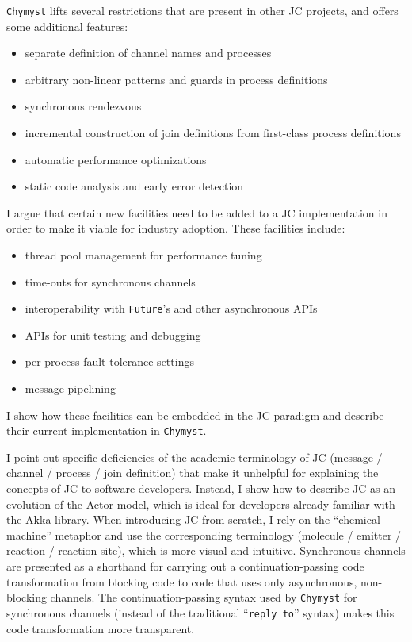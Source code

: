 \documentclass[sigplan,10pt,review,anonymous]{acmart}\settopmatter{printfolios=true}
\begin{document}
\texttt{Chymyst} lifts several restrictions that are present in other
JC projects, and offers some additional features:
\begin{itemize}
\item separate definition of channel names and processes
\item arbitrary non-linear patterns and guards in process definitions
\item synchronous rendezvous
\item incremental construction of join definitions from first-class process
definitions
\item automatic performance optimizations
\item static code analysis and early error detection
\end{itemize}
I argue that certain new facilities need to be added to a JC implementation
in order to make it viable for industry adoption. These facilities
include:
\begin{itemize}
\item thread pool management for performance tuning
\item time-outs for synchronous channels
\item interoperability with \texttt{Future}'s and other asynchronous APIs
\item APIs for unit testing and debugging
\item per-process fault tolerance settings
\item message pipelining
\end{itemize}
I show how these facilities can be embedded in the JC paradigm
and describe their current implementation in \texttt{Chymyst}.

I point out specific deficiencies of the academic terminology of JC
(message / channel / process / join definition) that make it unhelpful
for explaining the concepts of JC to software developers. Instead,
I show how to describe JC as an evolution of the Actor model, which
is ideal for developers already familiar with the Akka library. When
introducing JC from scratch, I rely on the ``chemical machine''
metaphor and use the corresponding terminology (molecule / emitter
/ reaction / reaction site), which is more visual and intuitive. Synchronous
channels are presented as a shorthand for carrying out a continuation-passing
code transformation from blocking code to code that uses only asynchronous,
non-blocking channels. The continuation-passing syntax used by \texttt{Chymyst}
for synchronous channels (instead of the traditional ``\texttt{reply
to}'' syntax) makes this code transformation more transparent.
\end{document}

